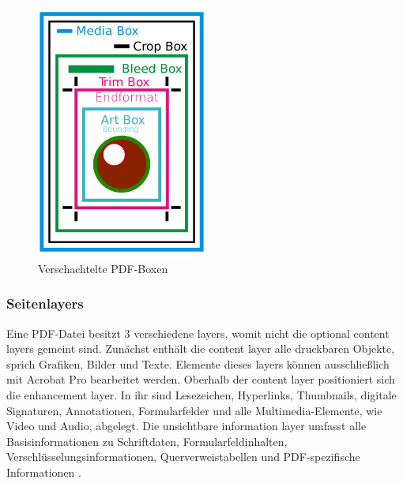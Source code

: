 \begin{figure}[!htb]
	\centering
	\includegraphics[width=0.5\textwidth]{"images/boxen-wiki-pdf-de.png"}
	\caption{Verschachtelte PDF-Boxen \cite{wiki-pdf-de}}
	\label{fig:boxen}
\end{figure}

\subsubsection{Seitenlayers}
Eine PDF-Datei besitzt 3 verschiedene layers, womit nicht die optional content layers gemeint sind. Zunächst enthält die content layer alle druckbaren Objekte, sprich Grafiken, Bilder und Texte. Elemente dieses layers können ausschließlich mit Acrobat Pro bearbeitet werden. Oberhalb der content layer positioniert sich die enhancement layer. In ihr sind Lesezeichen, Hyperlinks, Thumbnails, digitale Signaturen, Annotationen, Formularfelder und alle Multimedia-Elemente, wie Video und Audio, abgelegt. Die unsichtbare information layer umfasst alle Basisinformationen zu Schriftdaten, Formularfeldinhalten, Verschlüsselungsinformationen, Querverweistabellen und PDF-spezifische Informationen \cite{schneeberger}. 

